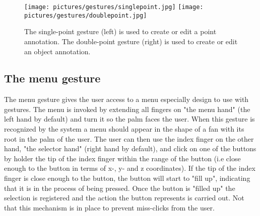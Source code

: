 \begin{figure}%
	\texttt{[image: pictures/gestures/singlepoint.jpg]}
    \texttt{[image: pictures/gestures/doublepoint.jpg]}
	\caption[The single-point and double-point gestures]{The single-point gesture (left) is used to create or edit a point annotation. 
             The double-point gesture (right) is used to create or edit an object annotation.}
	\label{fig:gestures3}
\end{figure} 

\subsection{The menu gesture}
The menu gesture gives the user access to a menu especially design to use with gestures. The menu is invoked by extending all fingers on 
"the menu hand" (the left hand by default) and turn it so the palm faces the user. When this gesture is recognized by the system a menu should 
appear in the shape of a fan with its root in the palm of the user. The user can then use the index finger on the other hand, "the selector hand" (right hand by default),
and click on one of the buttons by holder the tip of the index finger within the range of the button (i.e close enough to the button in terms of x-, y- and z coordinates).
If the tip of the index finger is close enough to the button, the button will start to "fill up", indicating that it is in the process of being pressed.
Once the button is "filled up" the selection is registered and the action the button represents is carried out. Not that this mechanism is in place
to prevent miss-clicks from the user.

